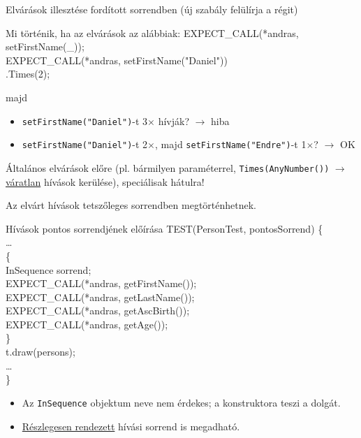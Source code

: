 \documentclass[usenames,dvipsnames,aspectratio=169]{beamer}
\newcommand{\hiv}[1]{{\color{hivatkozasszin}#1}}
\begin{document}
\begin{frame}
    Elvárások illesztése fordított sorrendben (új szabály felülírja a régit)
    \begin{exampleblock}{Mi történik, ha az elvárások az alábbiak:}
        EXPECT\_CALL(*andras, setFirstName(\_));\\
        EXPECT\_CALL(*andras, setFirstName("Daniel"))\\
        \qquad .Times(2);
    \end{exampleblock}
    majd
    \begin{itemize}
        \item \texttt{setFirstName("Daniel")}-t 3$\times$ hívják? $\to$ hiba
        \item \texttt{setFirstName("Daniel")}-t 2$\times$, majd \texttt{setFirstName("Endre")}-t 1$\times$? $\to$ OK
    \end{itemize}
    Általános elvárások előre (pl. bármilyen paraméterrel, \texttt{Times(AnyNumber())} $\to$ \hiv{\href{https://google.github.io/googletest/gmock\_cook\_book.html\#uninteresting-vs-unexpected}{váratlan}} hívások kerülése), speciálisak hátulra!
\end{frame}

\begin{frame}
    \footnotesize
    Az elvárt hívások tetszőleges sorrendben megtörténhetnek.
    \begin{exampleblock}{Hívások pontos sorrendjének előírása}
        \scriptsize
        TEST(PersonTest, pontosSorrend) \{ \\
        \qquad \dots \\
        \qquad \{ \\
        \qquad\qquad InSequence sorrend; \\
        \smallskip
        \qquad\qquad EXPECT\_CALL(*andras, getFirstName()); \\
        \qquad\qquad EXPECT\_CALL(*andras, getLastName()); \\
        \qquad\qquad EXPECT\_CALL(*andras, getAscBirth()); \\
        \qquad\qquad EXPECT\_CALL(*andras, getAge()); \\
        \qquad \} \\
        \qquad t.draw(persons); \\
        \qquad \dots \\
        \} %
    \end{exampleblock}
    \begin{itemize}
        \item Az \texttt{InSequence} objektum neve nem érdekes; a konstruktora teszi a dolgát.
        \item \hiv{\href{https://google.github.io/googletest/gmock\_cook\_book.html\#PartialOrder}{Részlegesen rendezett}} hívási sorrend is megadható.
    \end{itemize}
\end{frame}
\end{document}
